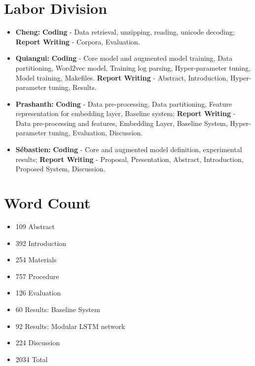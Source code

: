 \documentclass[12pt]{article}
\begin{document}
\section{Labor Division}
\begin{itemize}
\item
  \textbf{Cheng:} \textbf{Coding} - Data retrieval, unzipping, reading, unicode decoding; \textbf{Report Writing} - Corpora, Evaluation.
\item
  \textbf{Quiangui:} \textbf{Coding} - Core model and augmented model training, Data partitioning, Word2vec model, Training log parsing, Hyper-parameter tuning, Model training, Makefiles. \textbf{Report Writing} - Abstract, Introduction, Hyper-parameter tuning, Results.
\item
  \textbf{Prashanth:} \textbf{Coding} - Data pre-processing, Data partitioning,  Feature representation for embedding layer, Baseline system; \textbf{Report Writing} - Data pre-processing and features, Embedding Layer, Baseline System, Hyper-parameter tuning, Evaluation, Discussion.
\item
    \textbf{Sébastien:} \textbf{Coding} - Core and augmented model definition, experimental results; \textbf{Report Writing} - Proposal, Presentation, Abstract, Introduction, Proposed System, Discussion.
\end{itemize}
\section{Word Count}
\begin{itemize}
\item
109 Abstract
\item
392 Introduction
\item
254 Materials
\item
757 Procedure
\item
126 Evaluation
\item
60 Results: Baseline System
\item
92 Results: Modular LSTM network
\item
224 Discussion
\item
2034 Total
\end{itemize}
\end{document}

